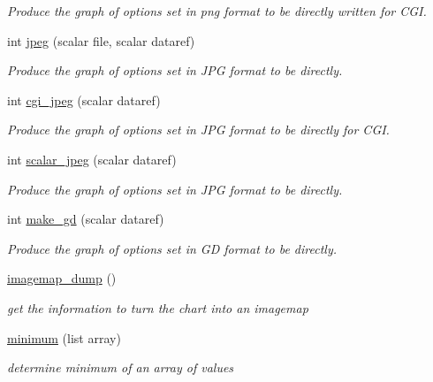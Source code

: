 \begin{DoxyCompactItemize}
\begin{DoxyCompactList}\small\item\em Produce the graph of options set in png format to be directly written for CGI. \item\end{DoxyCompactList}\item 
int \hyperlink{classChart_1_1Base_aa9791b8cc8b287fa966402574afaf03f}{jpeg} (scalar file, scalar dataref)
\begin{DoxyCompactList}\small\item\em Produce the graph of options set in JPG format to be directly. \item\end{DoxyCompactList}\item 
int \hyperlink{classChart_1_1Base_a4bb21f030ba3e48a8a1086634595a9cf}{cgi\_\-jpeg} (scalar dataref)
\begin{DoxyCompactList}\small\item\em Produce the graph of options set in JPG format to be directly for CGI. \item\end{DoxyCompactList}\item 
int \hyperlink{classChart_1_1Base_ac5d9aee386bf811e2770574fba85ec66}{scalar\_\-jpeg} (scalar dataref)
\begin{DoxyCompactList}\small\item\em Produce the graph of options set in JPG format to be directly. \item\end{DoxyCompactList}\item 
int \hyperlink{classChart_1_1Base_aee48a95d2dbc344911ee9a4cba3b51b0}{make\_\-gd} (scalar dataref)
\begin{DoxyCompactList}\small\item\em Produce the graph of options set in GD format to be directly. \item\end{DoxyCompactList}\item 
\hyperlink{classChart_1_1Base_af9fec7910f7254177a81252a03a0f587}{imagemap\_\-dump} ()
\begin{DoxyCompactList}\small\item\em get the information to turn the chart into an imagemap \item\end{DoxyCompactList}\item 
\hyperlink{classChart_1_1Base_ae65cef86e6b2f279b9446b01a9bea088}{minimum} (list array)
\begin{DoxyCompactList}\small\item\em determine minimum of an array of values \item\end{DoxyCompactList}\item 

\end{DoxyCompactItemize}

